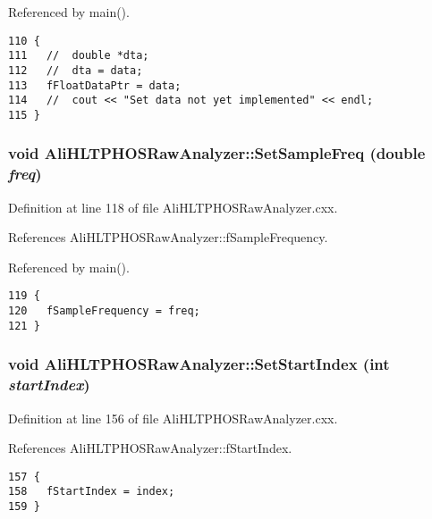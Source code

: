 Referenced by main().

\footnotesize\begin{verbatim}110 {
111   //  double *dta;
112   //  dta = data;
113   fFloatDataPtr = data;
114   //  cout << "Set data not yet implemented" << endl;
115 }
\end{verbatim}\normalsize 


\subsubsection{\setlength{\rightskip}{0pt plus 5cm}void Ali\-HLTPHOSRaw\-Analyzer::Set\-Sample\-Freq (double {\em freq})\hspace{0.3cm}{\tt  [inherited]}}\label{classAliHLTPHOSRawAnalyzer_AliHLTPHOSRawAnalyzerPeakFindera13}




Definition at line 118 of file Ali\-HLTPHOSRaw\-Analyzer.cxx.

References Ali\-HLTPHOSRaw\-Analyzer::f\-Sample\-Frequency.

Referenced by main().

\footnotesize\begin{verbatim}119 {
120   fSampleFrequency = freq;
121 }
\end{verbatim}\normalsize 


\subsubsection{\setlength{\rightskip}{0pt plus 5cm}void Ali\-HLTPHOSRaw\-Analyzer::Set\-Start\-Index (int {\em start\-Index})\hspace{0.3cm}{\tt  [inherited]}}\label{classAliHLTPHOSRawAnalyzer_AliHLTPHOSRawAnalyzerPeakFindera14}




Definition at line 156 of file Ali\-HLTPHOSRaw\-Analyzer.cxx.

References Ali\-HLTPHOSRaw\-Analyzer::f\-Start\-Index.

\footnotesize\begin{verbatim}157 {
158   fStartIndex = index;
159 }
\end{verbatim}\normalsize 


